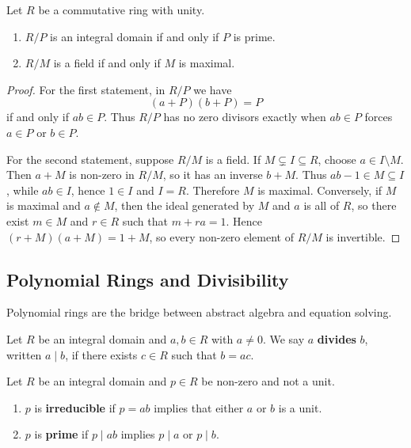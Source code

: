 \begin{theorem}
Let $R$ be a commutative ring with unity.
\begin{enumerate}
    \item $R/P$ is an integral domain if and only if $P$ is prime.
    \item $R/M$ is a field if and only if $M$ is maximal.
\end{enumerate}
\end{theorem}

\begin{proof}
For the first statement, in $R/P$ we have
\[
    (a+P)(b+P)=P
\]
if and only if $ab\in P$. Thus $R/P$ has no zero divisors exactly when $ab\in P$ forces $a\in P$ or $b\in P$.

For the second statement, suppose $R/M$ is a field. If $M\subsetneq I\subseteq R$, choose $a\in I\setminus M$. Then $a+M$ is non-zero in $R/M$, so it has an inverse $b+M$. Thus $ab-1\in M\subseteq I$, while $ab\in I$, hence $1\in I$ and $I=R$. Therefore $M$ is maximal. Conversely, if $M$ is maximal and $a\notin M$, then the ideal generated by $M$ and $a$ is all of $R$, so there exist $m\in M$ and $r\in R$ such that $m+ra=1$. Hence $(r+M)(a+M)=1+M$, so every non-zero element of $R/M$ is invertible.
\end{proof}

\subsection{Polynomial Rings and Divisibility}

Polynomial rings are the bridge between abstract algebra and equation solving.

\begin{definition}[Divisibility]
Let $R$ be an integral domain and $a,b\in R$ with $a\neq 0$. We say $a$ \textbf{divides} $b$, written $a\mid b$, if there exists $c\in R$ such that $b=ac$.
\end{definition}

\begin{definition}
Let $R$ be an integral domain and $p\in R$ be non-zero and not a unit.
\begin{enumerate}
    \item $p$ is \textbf{irreducible} if $p=ab$ implies that either $a$ or $b$ is a unit.
    \item $p$ is \textbf{prime} if $p\mid ab$ implies $p\mid a$ or $p\mid b$.
\end{enumerate}
\end{definition}

